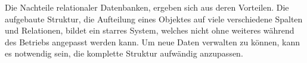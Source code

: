 Die Nachteile relationaler Datenbanken, ergeben sich aus deren Vorteilen. 
Die aufgebaute Struktur, die Aufteilung eines Objektes auf viele verschiedene Spalten und Relationen, bildet ein starres System, welches nicht ohne weiteres während des Betriebs angepasst werden kann. 
Um neue Daten verwalten zu können, kann es notwendig sein, die komplette Struktur aufwändig anzupassen.